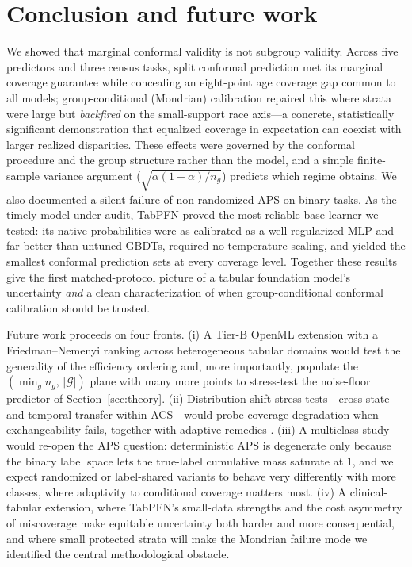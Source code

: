 \documentclass[review,12pt]{elsarticle}
\begin{document}
\section{Conclusion and future work}
\label{sec:conclusion}

We showed that marginal conformal validity is not subgroup validity. Across five predictors and three census tasks, split conformal prediction met its marginal coverage guarantee while concealing an eight-point age coverage gap common to all models; group-conditional (Mondrian) calibration repaired this where strata were large but \emph{backfired} on the small-support race axis---a concrete, statistically significant demonstration that equalized coverage in expectation can coexist with larger realized disparities. These effects were governed by the conformal procedure and the group structure rather than the model, and a simple finite-sample variance argument ($\sqrt{\alpha(1-\alpha)/n_g}$) predicts which regime obtains. We also documented a silent failure of non-randomized APS on binary tasks. As the timely model under audit, TabPFN proved the most reliable base learner we tested: its native probabilities were as calibrated as a well-regularized MLP and far better than untuned GBDTs, required no temperature scaling, and yielded the smallest conformal prediction sets at every coverage level. Together these results give the first matched-protocol picture of a tabular foundation model's uncertainty \emph{and} a clean characterization of when group-conditional conformal calibration should be trusted.

Future work proceeds on four fronts. (i) A Tier-B OpenML extension with a Friedman--Nemenyi ranking across heterogeneous tabular domains would test the generality of the efficiency ordering and, more importantly, populate the $(\min_g n_g,\,|\mathcal{G}|)$ plane with many more points to stress-test the noise-floor predictor of Section~\ref{sec:theory}. (ii) Distribution-shift stress tests---cross-state and temporal transfer within ACS---would probe coverage degradation when exchangeability fails, together with adaptive remedies \cite{gibbs2021,tibshirani2019}. (iii) A multiclass study would re-open the APS question: deterministic APS is degenerate only because the binary label space lets the true-label cumulative mass saturate at $1$, and we expect randomized or label-shared variants \cite{romano2020aps,ding2023} to behave very differently with more classes, where adaptivity to conditional coverage matters most. (iv) A clinical-tabular extension, where TabPFN's small-data strengths and the cost asymmetry of miscoverage make equitable uncertainty both harder and more consequential, and where small protected strata will make the Mondrian failure mode we identified the central methodological obstacle.
\end{document}
